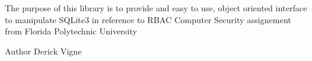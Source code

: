 The purpose of this library is to provide and easy to use, object oriented interface to manipulate S\+Q\+Lite3 in reference to R\+B\+AC Computer Security assignement from Florida Polytechnic University \begin{DoxyAuthor}{Author}
Derick Vigne 
\end{DoxyAuthor}
